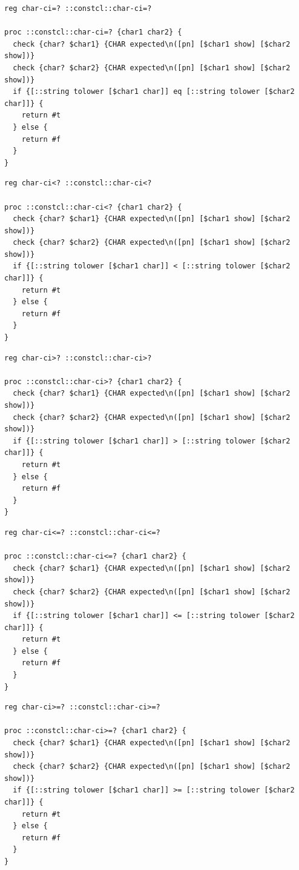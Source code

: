 \documentclass[twoside,9pt]{report}
\begin{document}
\noindent\makebox[\linewidth]{\rule{\linewidth}{0.4pt}}
\begin{lstlisting}
reg char-ci=? ::constcl::char-ci=?
 
proc ::constcl::char-ci=? {char1 char2} {
  check {char? $char1} {CHAR expected\n([pn] [$char1 show] [$char2 show])}
  check {char? $char2} {CHAR expected\n([pn] [$char1 show] [$char2 show])}
  if {[::string tolower [$char1 char]] eq [::string tolower [$char2 char]]} {
    return #t
  } else {
    return #f
  }
}
\end{lstlisting}
\noindent\makebox[\linewidth]{\rule{\linewidth}{0.4pt}}
\noindent\makebox[\linewidth]{\rule{\linewidth}{0.4pt}}
\begin{lstlisting}
reg char-ci<? ::constcl::char-ci<?
 
proc ::constcl::char-ci<? {char1 char2} {
  check {char? $char1} {CHAR expected\n([pn] [$char1 show] [$char2 show])}
  check {char? $char2} {CHAR expected\n([pn] [$char1 show] [$char2 show])}
  if {[::string tolower [$char1 char]] < [::string tolower [$char2 char]]} {
    return #t
  } else {
    return #f
  }
}
\end{lstlisting}
\noindent\makebox[\linewidth]{\rule{\linewidth}{0.4pt}}
\noindent\makebox[\linewidth]{\rule{\linewidth}{0.4pt}}
\begin{lstlisting}
reg char-ci>? ::constcl::char-ci>?
 
proc ::constcl::char-ci>? {char1 char2} {
  check {char? $char1} {CHAR expected\n([pn] [$char1 show] [$char2 show])}
  check {char? $char2} {CHAR expected\n([pn] [$char1 show] [$char2 show])}
  if {[::string tolower [$char1 char]] > [::string tolower [$char2 char]]} {
    return #t
  } else {
    return #f
  }
}
\end{lstlisting}
\noindent\makebox[\linewidth]{\rule{\linewidth}{0.4pt}}
\noindent\makebox[\linewidth]{\rule{\linewidth}{0.4pt}}
\begin{lstlisting}
reg char-ci<=? ::constcl::char-ci<=?
 
proc ::constcl::char-ci<=? {char1 char2} {
  check {char? $char1} {CHAR expected\n([pn] [$char1 show] [$char2 show])}
  check {char? $char2} {CHAR expected\n([pn] [$char1 show] [$char2 show])}
  if {[::string tolower [$char1 char]] <= [::string tolower [$char2 char]]} {
    return #t
  } else {
    return #f
  }
}
\end{lstlisting}
\noindent\makebox[\linewidth]{\rule{\linewidth}{0.4pt}}
\noindent\makebox[\linewidth]{\rule{\linewidth}{0.4pt}}
\begin{lstlisting}
reg char-ci>=? ::constcl::char-ci>=?
 
proc ::constcl::char-ci>=? {char1 char2} {
  check {char? $char1} {CHAR expected\n([pn] [$char1 show] [$char2 show])}
  check {char? $char2} {CHAR expected\n([pn] [$char1 show] [$char2 show])}
  if {[::string tolower [$char1 char]] >= [::string tolower [$char2 char]]} {
    return #t
  } else {
    return #f
  }
}
\end{lstlisting}
\noindent\makebox[\linewidth]{\rule{\linewidth}{0.4pt}}
\end{document}
